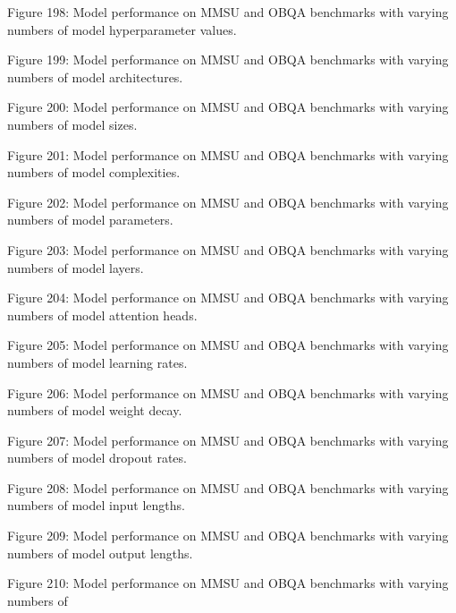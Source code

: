         Figure 198: Model performance on MMSU and OBQA benchmarks with varying numbers of model hyperparameter values.

        Figure 199: Model performance on MMSU and OBQA benchmarks with varying numbers of model architectures.

        Figure 200: Model performance on MMSU and OBQA benchmarks with varying numbers of model sizes.

        Figure 201: Model performance on MMSU and OBQA benchmarks with varying numbers of model complexities.

        Figure 202: Model performance on MMSU and OBQA benchmarks with varying numbers of model parameters.

        Figure 203: Model performance on MMSU and OBQA benchmarks with varying numbers of model layers.

        Figure 204: Model performance on MMSU and OBQA benchmarks with varying numbers of model attention heads.

        Figure 205: Model performance on MMSU and OBQA benchmarks with varying numbers of model learning rates.

        Figure 206: Model performance on MMSU and OBQA benchmarks with varying numbers of model weight decay.

        Figure 207: Model performance on MMSU and OBQA benchmarks with varying numbers of model dropout rates.

        Figure 208: Model performance on MMSU and OBQA benchmarks with varying numbers of model input lengths.

        Figure 209: Model performance on MMSU and OBQA benchmarks with varying numbers of model output lengths.

        Figure 210: Model performance on MMSU and OBQA benchmarks with varying numbers of